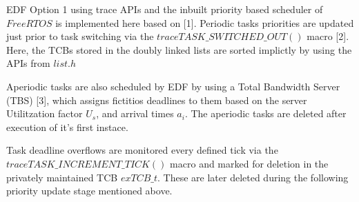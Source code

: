 \documentclass[10pt]{beamer}
\begin{document}
\begin{frame}
	\footnotesize{
		 EDF Option 1 using trace APIs and the inbuilt priority based scheduler of $FreeRTOS$ is implemented here based on [1].
		 Periodic tasks priorities are updated just prior to task switching via the $traceTASK\_SWITCHED\_OUT()$ macro [2]. 
		 Here, the TCBs stored in the doubly linked lists are sorted implictly by using the APIs from $list.h$
		 
		 \hfill\break
		 Aperiodic tasks are also scheduled by EDF by using a Total Bandwidth Server (TBS) [3], 
		 which assigns fictitios deadlines to them based on the server Utilitzation factor $U_{s}$, and arrival times $a_{i}$. 
		 The aperiodic tasks are deleted after execution of it's first instace. 

		 \hfill\break
		 Task deadline overflows are monitored every defined tick via the $traceTASK\_INCREMENT\_TICK()$ macro and marked for deletion 
		 in the privately maintained TCB $exTCB\_t$. 
		 These are later deleted during the following priority update stage mentioned above.
		 }%
\end{frame}


\end{document}
